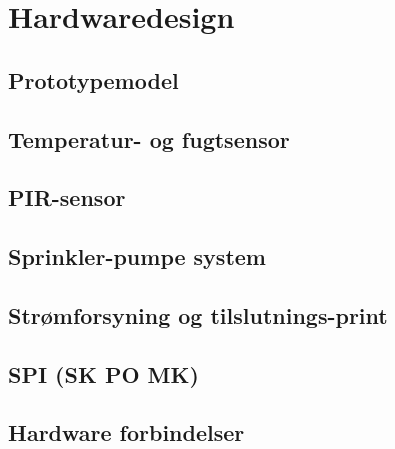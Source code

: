 \chapter{Hardwaredesign}

\section{Prototypemodel}


\section{Temperatur- og fugtsensor}


\section{PIR-sensor}


\section{Sprinkler-pumpe system}


\section{Strømforsyning og tilslutnings-print}


\section{SPI (SK PO MK)}


\section{Hardware forbindelser}

